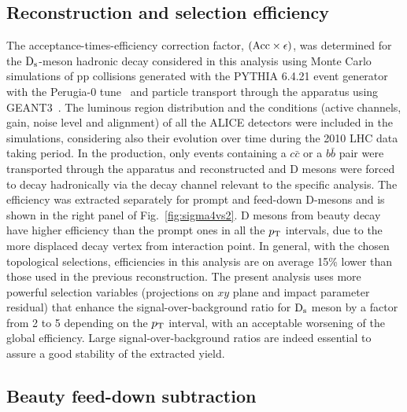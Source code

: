 \subsection{Reconstruction and selection efficiency}
The acceptance-times-efficiency correction factor, 
$(\rm Acc \times \epsilon)$, was determined for the ${\rm D_s}$-meson
hadronic decay considered in this analysis using Monte Carlo simulations 
of pp collisions generated with the PYTHIA 6.4.21 event generator~\cite{Sjostrand:2006za} with the 
Perugia-0 tune~\cite{Skands:2010ak} and particle transport through the apparatus 
using GEANT3~\cite{Brun:1994aa}.
The luminous region distribution and the conditions (active channels, gain, 
noise level and alignment) of all the ALICE detectors were included in the 
simulations, considering also their evolution over time during the 2010 LHC 
data taking period.
In the production, only events containing a $c\bar{c}$ or a $b\bar{b}$ pair 
were transported through the apparatus and reconstructed and
D mesons were forced to decay hadronically via the decay channel relevant to
the specific analysis.
The efficiency was extracted separately for prompt and feed-down D-mesons and 
is shown in the right panel of Fig.~\ref{fig:sigma4vs2}.
D mesons from beauty decay have higher efficiency than
the prompt ones in all the $p_{\rm T}$ intervals, due to the more displaced 
decay vertex from interaction point.
In general, with the chosen topological selections, efficiencies in this analysis
are on average 15\% lower than those used in the previous reconstruction. 
The present analysis uses more powerful selection variables 
(projections on $xy$ plane and impact parameter residual) that
enhance the signal-over-background ratio for ${\rm D_s}$ meson by a factor 
from 2 to 5 depending on the $p_{\rm T}$ interval, with an acceptable worsening
of the global efficiency. Large signal-over-background ratios are indeed essential 
to assure a good stability of the extracted yield.

\subsection{Beauty feed-down subtraction}

